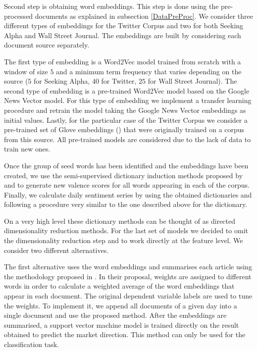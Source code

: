 \documentclass[a4paper, 12pt]{report}
\begin{document}
    Second step is obtaining word embeddings. This step is done using the pre-processed documents as explained in subsection \ref{DataPreProc}. We consider three different types of embeddings for the Twitter Corpus and two for both Seeking Alpha and Wall Street Journal. The embeddings are built by considering each document source separately.
    
    The first type of embedding is a Word2Vec model \textcite{Mikolov:2013} trained from scratch with a window of size $5$ and a minimum term frequency that varies depending on the source ($5$ for Seeking Alpha, $40$ for Twitter, $25$ for Wall Street Journal). The second type of embedding is a pre-trained Word2Vec model based on the Google News Vector model. For this type of embedding we implement a transfer learning procedure and retrain the model taking the Google News Vector embeddings as initial values. Lastly, for the particular case of the Twitter Corpus we consider a pre-trained set of Glove embeddings (\textcite{Pennington:2014}) that were originally trained on a corpus from this source. All pre-trained models are considered due to the lack of data to train new ones.
    
    Once the group of seed words has been identified and the embeddings have been created, we use the semi-supervised dictionary induction methods proposed by \textcite{An:2018} and \textcite{Hamilton:2016} to generate new valence scores for all words appearing in each of the corpus. Finally, we calculate daily sentiment series by using the obtained dictionaries and following a procedure very similar to the one described above for the \textcite{Loughran:2011} dictionary. 
    
    On a very high level these dictionary methods can be thought of as directed dimensionality reduction methods. For the last set of models we decided to omit the dimensionality reduction step and to work directly at the feature level. We consider two different alternatives. 
    
    The first alternative uses the word embeddings and summarises each article using the methodology proposed in \textcite{Gupta:2020}. In their proposal, weights are assigned to different words in order to calculate a weighted average of the word embeddings that appear in each document. The original dependent variable labels are used to tune the weights. To implement it, we append all documents of a given day into a single document and use the proposed method. After the embeddings are summarised, a support vector machine model is trained directly on the result obtained to predict the market direction. This method can only be used for the classification task. 
    
\end{document}
